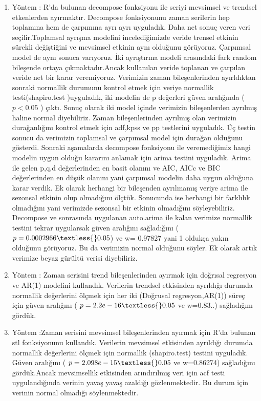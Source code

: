 \documentclass[11pt]{article}
\begin{document}
\begin{enumerate}
\def\labelenumi{\arabic{enumi}.}
\item
  Yöntem : R'da bulunan decompose fonksiyonu ile seriyi mevsimsel ve
  trendsel etkenlerden ayırmaktır. Decompose fonksiyonunu zaman
  serilerin hep toplamına hem de çarpımına ayrı ayrı uyguladık. Daha net
  sonuç veren veri seçilir.Toplamsal ayrışma modelini incelediğimizde
  veride trensel etkinin sürekli değiştiğini ve mevsimsel etkinin aynı
  olduğunu görüyoruz. Çarpımsal model de aynı sonuca varıyoruz. İki
  ayrıştırma modeli arasındaki fark random bileşende ortaya
  çıkmaktadır.Ancak kullanılan veride toplanan ve çarpılan veride net
  bir karar veremiyoruz. Verimizin zaman bileşenlerinden ayırldıktan
  sonraki normallik durumunu kontrol etmek için veriye normallik
  testi(shapiro.test )uyguladık, iki modelin de p değerleri güven
  aralığında (\(p<0.05\) ) çıktı. Sonuç olarak iki model içinde
  verimizin bileşenlerden ayrılmış haline normal diyebiliriz. Zaman
  bileşenlerinden ayrılmış olan verimizin durağanlığını kontrol etmek
  için adf,kpss ve pp testlerini uyguladık. Üç testin sonucu da
  verimizin toplamsal ve çarpımsal model için durağan olduğunu gösterdi.
  Sonraki aşamalarda decompose fonksiyonu ile veremediğimiz hangi
  modelin uygun olduğu kararını anlamak için arima testini uyguladık.
  Arima ile gelen p,q,d değerlerinden en basit olanını ve AIC, AICc ve
  BIC değerlerinden en düşük olanını yani çarpımsal modelin daha uygun
  olduğuna karar verdik. Ek olarak herhangi bir bileşenden ayrılmamış
  veriye arima ile sezonsal etkinin olup olmadığını ölçtük. Sonucunda
  ise herhangi bir farklılık olmadığını yani verimizde sezonsal bir
  etkinin olmadığını söyleyebiliriz. Decompose ve sonrasında uygulanan
  auto.arima ile kalan verimize normallik testini tekrar uygularsak
  güven aralığını sağladığını (\( p=0.0002966 \textless{}0.05 \)) ve w=
 0.97827 yani 1 oldukça yakın olduğunu görüyoruz. Bu da verimizin
  normal olduğunu söyler. Ek olarak artık verimize beyaz gürültü verisi
  diyebiliriz.
\item
  Yöntem : Zaman serisini trend bileşenlerinden ayırmak için doğrısal
  regresyon ve AR(1) modelini kullandık. Verilerin trendsel etkisinden
  ayrıldığı durumda normallik değerlerini ölçmek için her iki (Doğrusal
  regresyon,AR(1)) süreç için güven aralığını ( \(p=2.2e-16
  \textless{}0.05 \) ve w=0.83..) sağladığını gördük.
\item
  Yöntem :Zaman serisini mevsimsel bileşenlerinden ayırmak için R'da
  bulunan stl fonksiyonunu kullandık. Verilerin mevsimsel etkisinden
  ayrıldığı durumda normallik değerlerini ölçmek için normallik
  (shapiro.test) testini uyguladık. Güven aralığını ( \(p=2.098e-15
  \textless{}0.05 \) ve w=0.86274) sağladığını gördük.Ancak mevsimsellik
  etkisinden arındırılmış veri için acf testi uygulandığında verinin
  yavaş yavaş azaldığı gözlenmektedir. Bu durum için verinin normal
  olmadığı söylenmektedir.
\end{enumerate}
\end{document}
